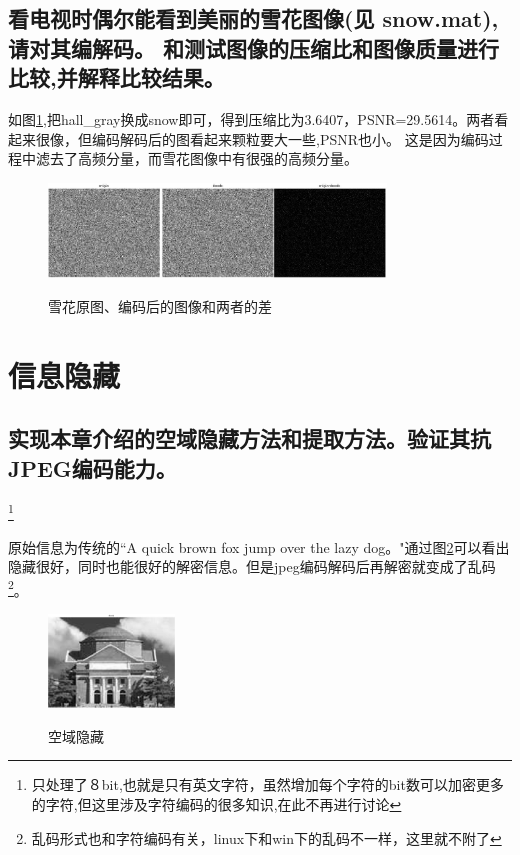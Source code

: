 \documentclass{ctexart}
\begin{document}
\subsection{
 看电视时偶尔能看到美丽的雪花图像(见 snow.mat),请对其编解码。
和测试图像的压缩比和图像质量进行比较,并解释比较结果。
}
如图\ref{a3212},把hall\_gray换成snow即可，得到压缩比为3.6407，PSNR=29.5614。两者看起来很像，但编码解码后的图看起来颗粒要大一些,PSNR也小。
这是因为编码过程中滤去了高频分量，而雪花图像中有很强的高频分量。
\begin{figure}
    \centering
    \includegraphics[width=0.8\textwidth]{pic/a3_2_12.jpg}\\
    \caption{雪花原图、编码后的图像和两者的差\label{a3212}}
\end{figure}

\section{信息隐藏}
\subsection{实现本章介绍的空域隐藏方法和提取方法。验证其抗JPEG编码能力。} 
\footnote{只处理了８bit,也就是只有英文字符，虽然增加每个字符的bit数可以加密更多的字符,但这里涉及字符编码的很多知识,在此不再进行讨论}

原始信息为传统的“A quick brown fox jump over the lazy dog。"通过图\ref{a331}可以看出隐藏很好，同时也能很好的解密信息。但是jpeg编码解码后再解密就变成了乱码\footnote{乱码形式也和字符编码有关，linux下和win下的乱码不一样，这里就不附了}。

\begin{figure}
    \centering
    \includegraphics[width=0.3\textwidth]{pic/a3_3_1.jpg}\\
    \caption{空域隐藏\label{a331}}
\end{figure}
\end{document}
